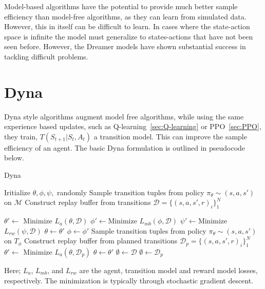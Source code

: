 Model-based algorithms have the potential to provide much better sample efficiency than model-free algorithms, as they can learn from simulated data. However, this in itself can be difficult to learn. In cases where the state-action space is infinite the model must generalize to states-actions that have not been seen before. However, the Dreamer models have shown substantial success in tackling difficult problems\cite{hafner2023mastering, hafner2020mastering}.

\section{Dyna} \label{sec:Dyna}
Dyna style algorithms\cite{sutton2018reinforcement, sutton2012dyna} augment model free algorithms, while using the same experience based updates, such as Q-learning~\ref{sec:Q-learning} or PPO~\ref{sec:PPO}, they train, $T(S_{t+1}|S_t, A_t)$ a transition model. This can improve the sample efficiency of an agent. The basic Dyna formulation is outlined in pseudocode below.
\begin{algorithm}
	\caption{Dyna}
	\begin{algorithmic}
		\State Iritialize $\theta, \phi, \psi,$ randomly
		\State Sample transition tuples from policy $\pi_\theta \sim (s, a, s')$ on $\mathcal{M}$
		\State Construct replay buffer from transitions $\mathcal{D} = \{(s, a, s', r)_i\}_1^N$

		\State $\theta' \leftarrow$ Minimize $L_{a}(\theta, \mathcal{D})$
		\State $\phi' \leftarrow $Minimize $L_{mb}(\phi , \mathcal{D})$
		\State $\psi' \leftarrow $Minimize $L_{rw}(\psi , \mathcal{D})$
		\EndFor
		\State $\theta \leftarrow \theta'$
		\State $\phi \leftarrow \phi'$
		\State Sample transition tuples from policy $\pi_\theta \sim (s, a, s')$ on $T_\phi$
		\State Construct replay buffer from planned transitions $\mathcal{D}_{p} = \{(s, a, s', r)_i\}_1^N$
		\State $\theta' \leftarrow$ Minimize $L_{a}(\theta, \mathcal{D}_p)$
		\EndFor
		\State $\theta \leftarrow \theta'$
		\State $\emptyset \leftarrow \mathcal{D}$
		\State $\emptyset \leftarrow \mathcal{D}_p$
		\EndFor
		\EndFor
	\end{algorithmic}
	\label{algo:Dyna}
\end{algorithm}
Here; $L_{a}$, $L_{mb}$, and $L_{rw}$ are the agent, transition model and reward model losses, respectively. The minimization is typically through stochastic gradient descent.

